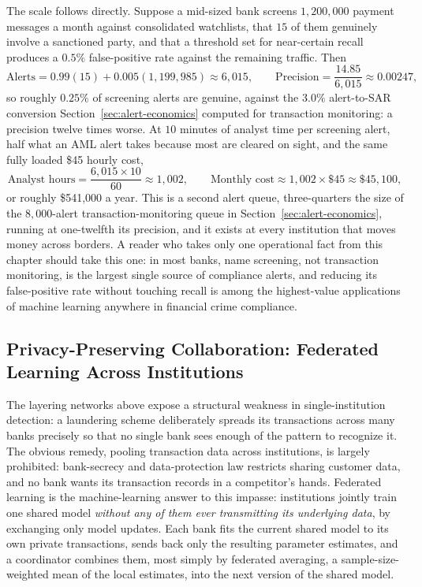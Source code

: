 \documentclass[../ai_in_finance]{subfiles}
\begin{document}
The scale follows directly. Suppose a mid-sized bank screens $1{,}200{,}000$ payment messages a month against consolidated watchlists, that $15$ of them genuinely involve a sanctioned party, and that a threshold set for near-certain recall produces a $0.5\%$ false-positive rate against the remaining traffic. Then
\begin{equation*}
\text{Alerts} = 0.99(15) + 0.005(1{,}199{,}985) \approx 6{,}015, \qquad \text{Precision} = \frac{14.85}{6{,}015} \approx 0.00247,
\end{equation*}
so roughly $0.25\%$ of screening alerts are genuine, against the $3.0\%$ alert-to-SAR conversion Section~\ref{sec:alert-economics} computed for transaction monitoring: a precision twelve times worse. At $10$ minutes of analyst time per screening alert, half what an AML alert takes because most are cleared on sight, and the same fully loaded \$45 hourly cost,
\begin{equation*}
\text{Analyst hours} = \frac{6{,}015 \times 10}{60} \approx 1{,}002, \qquad \text{Monthly cost} \approx 1{,}002 \times \$45 \approx \$45{,}100,
\end{equation*}
or roughly \$541,000 a year. This is a second alert queue, three-quarters the size of the $8{,}000$-alert transaction-monitoring queue in Section~\ref{sec:alert-economics}, running at one-twelfth its precision, and it exists at every institution that moves money across borders. A reader who takes only one operational fact from this chapter should take this one: in most banks, name screening, not transaction monitoring, is the largest single source of compliance alerts, and reducing its false-positive rate without touching recall is among the highest-value applications of machine learning anywhere in financial crime compliance.

\subsection{Privacy-Preserving Collaboration: Federated Learning Across Institutions}
\label{sec:federated-aml}

The layering networks above expose a structural weakness in single-institution detection: a laundering scheme deliberately spreads its transactions across many banks precisely so that no single bank sees enough of the pattern to recognize it. The obvious remedy, pooling transaction data across institutions, is largely prohibited: bank-secrecy and data-protection law restricts sharing customer data, and no bank wants its transaction records in a competitor's hands. Federated learning is the machine-learning answer to this impasse: institutions jointly train one shared model \emph{without any of them ever transmitting its underlying data}, by exchanging only model updates. Each bank fits the current shared model to its own private transactions, sends back only the resulting parameter estimates, and a coordinator combines them, most simply by federated averaging, a sample-size-weighted mean of the local estimates, into the next version of the shared model.
\end{document}
